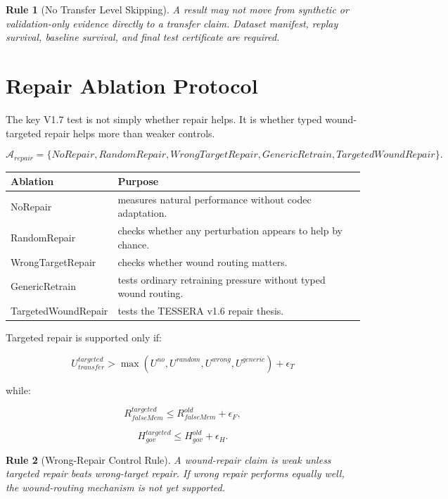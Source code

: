 \documentclass[12pt]{article}
\newtheorem{rulebox}{Rule}
\begin{document}
\begin{rulebox}[No Transfer Level Skipping]
A result may not move from synthetic or validation-only evidence directly to a
transfer claim. Dataset manifest, replay survival, baseline survival, and final
test certificate are required.
\end{rulebox}

\section{Repair Ablation Protocol}

The key V1.7 test is not simply whether repair helps. It is whether typed
wound-targeted repair helps more than weaker controls.

\[
\mathcal{A}_{repair}=\{NoRepair,RandomRepair,WrongTargetRepair,GenericRetrain,TargetedWoundRepair\}.
\]

\begin{longtable}{p{}p{}}
\toprule
\textbf{Ablation} & \textbf{Purpose} \\
\midrule
NoRepair & measures natural performance without codec adaptation. \\
RandomRepair & checks whether any perturbation appears to help by chance. \\
WrongTargetRepair & checks whether wound routing matters. \\
GenericRetrain & tests ordinary retraining pressure without typed wound routing. \\
TargetedWoundRepair & tests the TESSERA v1.6 repair thesis. \\
\bottomrule
\end{longtable}

Targeted repair is supported only if:

\[
\boxed{
U^{targeted}_{transfer}>
\max(U^{no},U^{random},U^{wrong},U^{generic})+\epsilon_T
}
\]

while:

\[
R^{targeted}_{falseMem}\leq R^{old}_{falseMem}+\epsilon_F,
\]

\[
H^{targeted}_{gov}\leq H^{old}_{gov}+\epsilon_H.
\]

\begin{rulebox}[Wrong-Repair Control Rule]
A wound-repair claim is weak unless targeted repair beats wrong-target repair.
If wrong repair performs equally well, the wound-routing mechanism is not yet
supported.
\end{rulebox}
\end{document}
